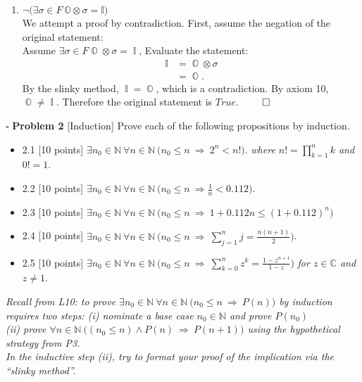 \documentclass[11pt]{article}
\numberwithin{equation}{section}
\DeclareMathOperator*{\OO}{\mathbb{O}}
\DeclareMathOperator*{\I}{\mathbb{I}}
\DeclareMathOperator*{\+}{\oplus}
\DeclareMathOperator*{\x}{\otimes}
\begin{document}
\begin{enumerate}[label= 1.\arabic*), itemsep=0.4cm]
  \newpage
  \item %
    $\neg \Big ( \exists \sigma \in F \ \mathbb{O} \otimes \sigma= \mathbb{I} \Big ) $\\
    We attempt a proof by contradiction. First, assume the negation of the original statement: \\
    Assume $\exists \sigma \in F \OO \x \sigma = \I$, Evaluate the statement: 
    \begin{align*}
      \I &= \OO \x \sigma\\
         &= \OO .
    \end{align*}
   By the slinky method, $\I = \OO$, which is a contradiction. By axiom 10, $\OO \neq \I$. Therefore the original statement is $True$. $\qed$




\end{enumerate}




   \newpage
    \noindent $\square$ \textbf{Problem 2}  [\textsf{Induction}] Prove each of the following propositions by induction.
      \begin{itemize} 
   \itemsep0em 
  \item 2.1 [10 points] $ \exists n_0 \in \mathbb{N} \  \forall n \in \mathbb{N} \ \Big (n_0 \leq n \ \Rightarrow \ 2^n < n! \Big )$. \textit{where $n! = \prod\limits_{k=1}^n k$ and $0!=1$}.
 \item 2.2 [10 points] $ \exists n_0 \in \mathbb{N} \ \forall n \in \mathbb{N} \ \Big (n_0 \leq n \ \Rightarrow \frac{1}{n} < 0.112 \Big )$.
 \item 2.3 [10 points] $\exists n_0 \in \mathbb{N} \ \forall n \in \mathbb{N} \ \Big (n_0 \leq n \ \Rightarrow \ 1+0.112n \leq (1+ 0.112)^n \Big )$
  \item 2.4 [10 points] $\exists n_0 \in \mathbb{N} \ \forall n \in \mathbb{N} \ \Big (n_0 \leq n \ \Rightarrow \ \sum\limits_{j=1}^n j= \frac{n(n+1)}{2} \Big )$.
  \item 2.5 [10 points] $\exists n_0 \in \mathbb{N} \ \forall n \in \mathbb{N} \ \Big (n_0 \leq n \ \Rightarrow \ \sum\limits_{k=0}^n z^k = \frac{1-z^{n+1}}{1-z} \Big )$ \textit{for $z \in \mathbb{C}$ and $z \neq 1$}.
   \end{itemize}
  {\small 
  \noindent \textit{Recall from \textnormal{\textsf{L10}}: to prove $\exists n_0 \in \mathbb{N} \ \forall n \in \mathbb{N} \ \Big ( n_0 \leq n \ \Rightarrow \ P(n) \Big )$ by induction requires two steps:
  \indent \textnormal{(i)} nominate a base case $n_0 \in \mathbb{N}$ and prove $P(n_0)$\\
  \indent \textnormal{(ii)} prove $\forall n \in \mathbb{N} \ \Big ( (n_0 \leq n)  \land P(n) \ \Rightarrow \ P(n+1) \Big )$ using the hypothetical strategy from \textnormal{\textsf{P3}}.\\ 
In the inductive step \textnormal{(ii)}, try to format your proof of the implication via the ``slinky method''.}}
\end{document}
